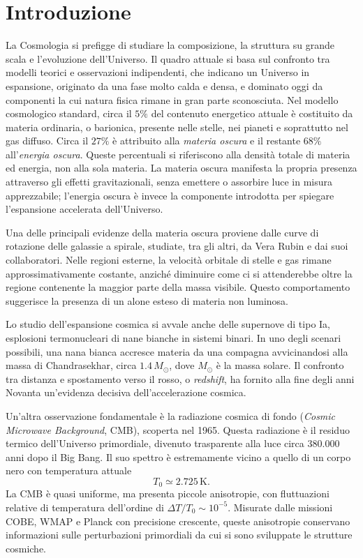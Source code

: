 \chapter{Introduzione}
La Cosmologia si prefigge di studiare la composizione, la struttura su grande scala e l'evoluzione dell'Universo. Il quadro attuale si basa sul confronto tra modelli teorici e osservazioni indipendenti, che indicano un Universo in espansione, originato da una fase molto calda e densa, e dominato oggi da componenti la cui natura fisica rimane in gran parte sconosciuta. Nel modello cosmologico standard, circa il $5\%$ del contenuto energetico attuale è costituito da materia ordinaria, o barionica, presente nelle stelle, nei pianeti e soprattutto nel gas diffuso. Circa il $27\%$ è attribuito alla \emph{materia oscura} e il restante $68\%$ all'\emph{energia oscura}. Queste percentuali si riferiscono alla densità totale di materia ed energia, non alla sola materia. La materia oscura manifesta la propria presenza attraverso gli effetti gravitazionali, senza emettere o assorbire luce in misura apprezzabile; l'energia oscura è invece la componente introdotta per spiegare l'espansione accelerata dell'Universo.

Una delle principali evidenze della materia oscura proviene dalle curve di rotazione delle galassie a spirale, studiate, tra gli altri, da Vera Rubin e dai suoi collaboratori. Nelle regioni esterne, la velocità orbitale di stelle e gas rimane approssimativamente costante, anziché diminuire come ci si attenderebbe oltre la regione contenente la maggior parte della massa visibile. Questo comportamento suggerisce la presenza di un alone esteso di materia non luminosa.

Lo studio dell'espansione cosmica si avvale anche delle supernove di tipo Ia, esplosioni termonucleari di nane bianche in sistemi binari. In uno degli scenari possibili, una nana bianca accresce materia da una compagna avvicinandosi alla massa di Chandrasekhar, circa $1.4\,M_\odot$, dove $M_\odot$ è la massa solare. Il confronto tra distanza e spostamento verso il rosso, o \emph{redshift}, ha fornito alla fine degli anni Novanta un'evidenza decisiva dell'accelerazione cosmica.

Un'altra osservazione fondamentale è la radiazione cosmica di fondo (\emph{Cosmic Microwave Background}, CMB), scoperta nel 1965. Questa radiazione è il residuo termico dell'Universo primordiale, divenuto trasparente alla luce circa 380.000 anni dopo il Big Bang. Il suo spettro è estremamente vicino a quello di un corpo nero con temperatura attuale
\begin{equation}
    T_0 \simeq 2.725\,\mathrm{K}.
\end{equation}
La CMB è quasi uniforme, ma presenta piccole anisotropie, con fluttuazioni relative di temperatura dell'ordine di $\Delta T/T_0 \sim 10^{-5}$. Misurate dalle missioni COBE, WMAP e Planck con precisione crescente, queste anisotropie conservano informazioni sulle perturbazioni primordiali da cui si sono sviluppate le strutture cosmiche.

